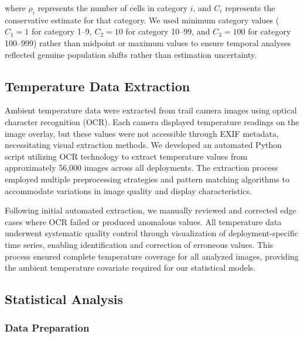 where $\rho_i$ represents the number of cells in category $i$, and $C_i$ represents the conservative estimate for that category. We used minimum category values ($C_1 = 1$ for category 1–9, $C_2 = 10$ for category 10–99, and $C_3 = 100$ for category 100–999) rather than midpoint or maximum values to ensure temporal analyses reflected genuine population shifts rather than estimation uncertainty.

\subsection{Temperature Data Extraction}

Ambient temperature data were extracted from trail camera images using optical character recognition (OCR). Each camera displayed temperature readings on the image overlay, but these values were not accessible through EXIF metadata, necessitating visual extraction methods. We developed an automated Python script utilizing OCR technology to extract temperature values from approximately 56,000 images across all deployments. The extraction process employed multiple preprocessing strategies and pattern matching algorithms to accommodate variations in image quality and display characteristics.

Following initial automated extraction, we manually reviewed and corrected edge cases where OCR failed or produced anomalous values. All temperature data underwent systematic quality control through visualization of deployment-specific time series, enabling identification and correction of erroneous values. This process ensured complete temperature coverage for all analyzed images, providing the ambient temperature covariate required for our statistical models.

\subsection{Statistical Analysis}
\label{sec:statistical-analysis}

\subsubsection{Data Preparation}

